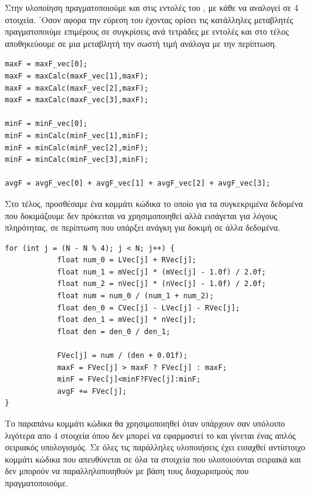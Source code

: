 \documentclass{article}
\begin{document}
\vspace{5mm}
Στην υλοποίηση πραγματοποιούμε  και  στις εντολές του , με κάθε  να αναλογεί σε 4 στοιχεία. ΄Οσον αφορα την εύρεση του  έχοντας ορίσει τις κατάλληλες  μεταβλητές πραγματοποιύμε επιμέρους σε συγκρίσεις ανά τετράδες με  εντολές και στο τέλος αποθηκεύουμε σε μια  μεταβλητή την σωστή τιμή ανάλογα με την περίπτωση.\\
\newpage
{}
\begin{lstlisting}
maxF = maxF_vec[0];
maxF = maxCalc(maxF_vec[1],maxF);
maxF = maxCalc(maxF_vec[2],maxF);
maxF = maxCalc(maxF_vec[3],maxF);

minF = minF_vec[0];
minF = minCalc(minF_vec[1],minF);
minF = minCalc(minF_vec[2],minF);
minF = minCalc(minF_vec[3],minF);

avgF = avgF_vec[0] + avgF_vec[1] + avgF_vec[2] + avgF_vec[3];
\end{lstlisting}
\vspace{5mm}
Στο τέλος, προσθέσαμε ένα κομμάτι κώδικα το οποίο για τα συγκεκριμένα δεδομένα που δοκιμάζουμε δεν πρόκειται να χρησιμοποιηθεί αλλά εισάγεται για λόγους πληρότητας, σε περίπτωση που υπάρξει ανάγκη για δοκιμή σε άλλα δεδομένα.

\begin{lstlisting}
for (int j = (N - N % 4); j < N; j++) {
            float num_0 = LVec[j] + RVec[j];
            float num_1 = mVec[j] * (mVec[j] - 1.0f) / 2.0f;
            float num_2 = nVec[j] * (nVec[j] - 1.0f) / 2.0f;
            float num = num_0 / (num_1 + num_2);
            float den_0 = CVec[j] - LVec[j] - RVec[j];
            float den_1 = mVec[j] * nVec[j];
            float den = den_0 / den_1;

            FVec[j] = num / (den + 0.01f);
            maxF = FVec[j] > maxF ? FVec[j] : maxF;
            minF = FVec[j]<minF?FVec[j]:minF;
            avgF += FVec[j];
}
\end{lstlisting}
Το παραπάνω κομμάτι κώδικα θα χρησιμοποιηθεί όταν υπάρχουν σαν υπόλοιπο λιγότερα απο 4 στοιχεία όπου δεν μπορεί να εφαρμοστεί το  και γίνεται ένας απλός σειριακός υπολογισμός. Σε όλες τις παράλληλες υλοποιήσεις έχει εισαχθεί αντίστοιχο κομμάτι κώδικα που απευθύνεται σε όλα τα στοιχεία που υλοποιούνται σειριακά και δεν μπορούν να παραλληλοποιηθούν με βάση τους διαχωρισμούς που πραγματοποιούμε.
\end{document}
